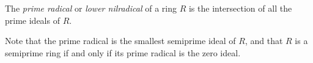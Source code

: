 \documentclass{article}
\begin{document}
The {\it prime radical} or {\it lower nilradical} of a ring $R$ is the intersection of all the prime ideals of $R$.

Note that the prime radical is the smallest semiprime ideal of $R$, and that $R$ is a semiprime ring if and only if its prime radical is the zero ideal.
\end{document}
